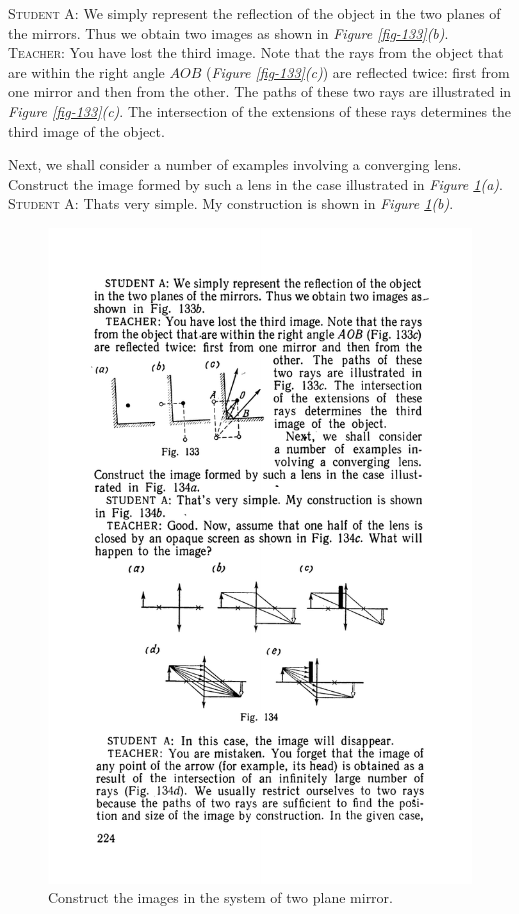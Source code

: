 \documentclass[a4paper,sfsidenotes]{tufte-book}
\begin{document}
\textsc{Student A:} We simply represent the reflection of the object in the two planes of the mirrors. Thus we obtain two images as shown in \emph{Figure \ref{fig-133}(b)}.
\\
\textsc{Teacher:} You have lost the third image. Note that the rays from the object that are within the right angle $AOB$ (\emph{Figure \ref{fig-133}(c)}) are reflected twice: first from one mirror and then from the other. The paths of these two rays are illustrated in \emph{Figure \ref{fig-133}(c)}. The intersection of the extensions of these rays determines the third image of the object.

Next, we shall consider a number of examples involving a converging lens. Construct the image formed by such a lens in the case illustrated in \emph{Figure \ref{fig-134}(a)}.
\\
\textsc{Student A:} Thats very simple. My construction is shown in \emph{Figure \ref{fig-134}(b)}.

\begin{figure}%
\includegraphics[width=\linewidth]{fig-134a}
\caption{Construct the images in the system of two plane mirror.}
\label{fig-134}
\end{figure}
\end{document}
